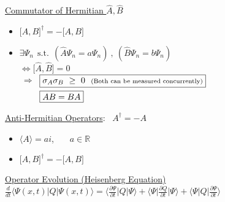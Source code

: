 \documentclass[12pt]{article}
\begin{document}
\vspace{15pt} \noindent
\begin{minipage}[t]{.53\textwidth}
    \underline{Commutator of Hermitian \(\widehat{A}, \widehat{B}\)}
    \begin{itemize}
        \item \( \big[A,B \big]^\dagger = - \big[ A,B \big] \)
        \item \( \exists \Psi_n \ \ \text{s.t.} \ \ \left( \widehat{A} \Psi_n = a \Psi_n \right) \ , \ 
            \left( \widehat{B} \Psi_n = b \Psi_n \right) \) \\[5pt]
        \( \Leftrightarrow \big[ \widehat{A}, \widehat{B} \big] = 0 \) \\[5pt]
        \( \ \Rightarrow \ \) \( \begin{aligned}[t]
            &\boxed{ \sigma_A \sigma_B \ \geq \ 0 \ \ 
                \text{\scriptsize (Both can be measured concurrently)} } \\
            &\boxed{AB = BA}
        \end{aligned} \)
    \end{itemize}    
\end{minipage}
\hfill
\begin{minipage}[t]{.4\textwidth}
    \underline{Anti-Hermitian Operators}: \ \( A^\dagger = - A \)
    \begin{itemize}
        \item \( \langle A \rangle = ai \), \ \ \ \( a \in \mathbb{R} \)
        \item \( \big[ A,B \big]^\dagger = - \big[ A,B \big] \)
    \end{itemize}
\end{minipage}


%
%
%
\newpage \noindent
\underline{Operator Evolution (Heisenberg Equation)}\\[10pt]
\(\displaystyle
    \frac{d}{dt} \Big\langle \Psi(x,t) \Big| Q \Big| \Psi(x,t) \Big\rangle 
        = \Big\langle \frac{\partial \Psi}{\partial t} \Big| Q \Big| \Psi \Big\rangle 
        + \Big\langle \Psi \Big| \frac{\partial Q}{\partial t} \Big| \Psi \Big\rangle 
        + \Big\langle \Psi \Big| Q \Big| \frac{\partial \Psi}{\partial t} \Big\rangle 
\)
\end{document}
